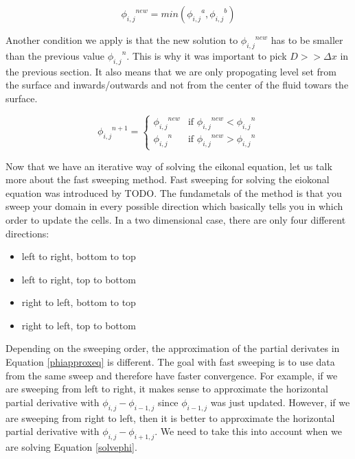 \begin{equation}
{\phi_{i,j}}^{new} = min({\phi_{i,j}}^a, {\phi_{i,j}}^b)
\end{equation}

Another condition we apply is that the new solution to ${\phi_{i,j}}^{new}$ has to be smaller than the previous value ${\phi_{i,j}}^{n}$. This is why it was important to pick $D >> \Delta x$ in the previous section. It also means that we are only propogating level set from the surface and inwards/outwards and not from the center of the fluid towars the surface.

\begin{equation}
{\phi_{i,j}}^{n+1} = 
\left\{
\begin{array}{ll}
{\phi_{i,j}}^{new} & \mbox{if ${\phi_{i,j}}^{new} < {\phi_{i,j}}^{n}$} \\
{\phi_{i,j}}^{n} & \mbox{if ${\phi_{i,j}}^{new} > {\phi_{i,j}}^{n}$}
\end{array}
\right.
\end{equation}

Now that we have an iterative way of solving the eikonal equation, let us talk more about the fast sweeping method. Fast sweeping for solving the eiokonal equation was introduced by TODO. The fundametals of the method is that you sweep your domain in every possible direction which basically tells you in which order to update the cells. In a two dimensional case, there are only four different directions:

\begin{itemize}
\item left to right, bottom to top
\item left to right, top to bottom
\item right to left, bottom to top
\item right to left, top to bottom
\end{itemize}

Depending on the sweeping order, the approximation of the partial derivates in Equation \ref{phiapproxeq} is different. The goal with fast sweeping is to use data from the same sweep and therefore have faster convergence. For example, if we are sweeping from left to right, it makes sense to approximate the horizontal partial derivative with $\phi_{i,j} - \phi_{i-1,j}$ since $\phi_{i-1,j}$ was just updated. However, if we are sweeping from right to left, then it is better to approximate the horizontal partial derivative with $\phi_{i,j} - \phi_{i+1,j}$. We need to take this into account when we are solving Equation \ref{solvephi}.

